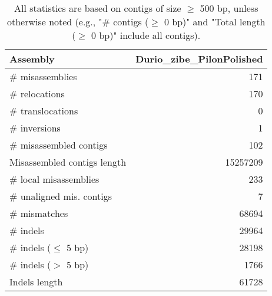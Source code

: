 \documentclass[12pt,a4paper]{article}
\begin{document}
\begin{table}[ht]
\begin{center}
\caption{All statistics are based on contigs of size $\geq$ 500 bp, unless otherwise noted (e.g., "\# contigs ($\geq$ 0 bp)" and "Total length ($\geq$ 0 bp)" include all contigs).}
\begin{tabular}{|l*{1}{|r}|}
\hline
Assembly & Durio\_zibe\_PilonPolished \\ \hline
\# misassemblies & 171 \\ \hline
\hspace{5mm}\# relocations & 170 \\ \hline
\hspace{5mm}\# translocations & 0 \\ \hline
\hspace{5mm}\# inversions & 1 \\ \hline
\# misassembled contigs & 102 \\ \hline
Misassembled contigs length & 15257209 \\ \hline
\# local misassemblies & 233 \\ \hline
\# unaligned mis. contigs & 7 \\ \hline
\# mismatches & 68694 \\ \hline
\# indels & 29964 \\ \hline
\hspace{5mm}\# indels ($\leq$ 5 bp) & 28198 \\ \hline
\hspace{5mm}\# indels ($>$ 5 bp) & 1766 \\ \hline
Indels length & 61728 \\ \hline
\end{tabular}
\end{center}
\end{table}
\end{document}
